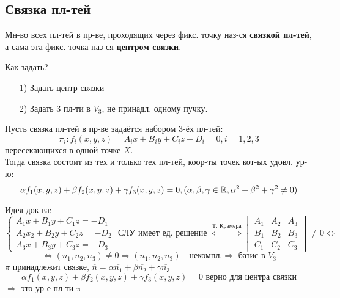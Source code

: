 \subsection{Связка пл-тей}
\begin{definition}
Мн-во всех пл-тей в пр-ве, проходящих через фикс. точку наз-ся \textbf{связкой пл-тей}, а сама эта фикс. точка наз-ся \textbf{центром связки}.
\end{definition}
\underline{Как задать?}
\begin{itemize}
  \item [1) ] Задать центр связки
  \item [2) ] Задать 3 пл-ти в $V_3$, не принадл. одному пучку.
\end{itemize}
\begin{theorem}
Пусть связка пл-тей в пр-ве задаётся набором 3-ёх пл-тей:
\[
\pi_i \colon f_i(x, y, z) = A_i x + B_i y + C_i z + D_i = 0, i = 1, 2, 3
\]
пересекающихся в одной точке $X$. \\

Тогда связка состоит из тех и только тех пл-тей, коор-ты точек кот-ых удовл. ур-ю:
\[
\alpha f_1(x, y, z) + \beta f_2(x, y, z) + \gamma f_3(x, y, z) = 0, (\alpha, \beta, \gamma \in \mathbb{R}, \alpha^{2} + \beta^{2} + \gamma^{2} \neq 0)
\]
\end{theorem}
Идея док-ва: 
\[
\begin{cases}
A_1 x + B_1 y + C_1 z = - D_1 \\
A_2 x_2 + B_2 y + C_2 z = - D_2 \\
A_3 x + B_3 y + C_3 z = - D_3
\end{cases} \text{ СЛУ имеет ед. решение $\overset{\text{Т. Крамера}}{\iff} \begin{vmatrix}A_1 & A_2 & A_3 \\ B_1 & B_2 & B_3 \\ C_1 & C_2 & C_3 \end{vmatrix} \neq 0 \iff $ }
\]
\[
\iff (\overline{n_1}, \overline{n_2}, \overline{n_3}) \neq 0 \Rightarrow (\overline{n_1}, \overline{n_2}, \overline{n_3}) \text{ - некомпл.} \Rightarrow \text{ базис в $V_3$}
\]
$\pi$ принадлежит связке, $\overline{n} = \alpha\overline{n_1} + \beta\overline{n_2} + \gamma\overline{n_3}$
\[
\alpha f_1(x, y, z) + \beta f_2(x, y, z) + \gamma f_3(x, y, z) = 0 \text{ верно для центра связки}
\]
$\Rightarrow$ это ур-е пл-ти $\pi$

